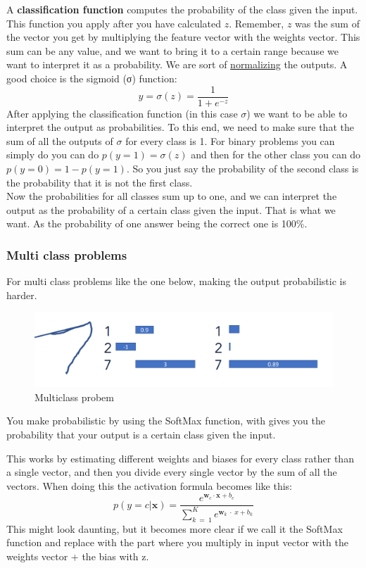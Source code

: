 \documentclass[
  11pt,
  british,
]{article}
\begin{document}
A \textbf{classification function} computes the probability of the class
given the input. This function you apply after you have calculated
\(z\). Remember, \(z\) was the sum of the vector you get by multiplying
the feature vector with the weights vector. This sum can be any value,
and we want to bring it to a certain range because we want to interpret
it as a probability. We are sort of
\href{../Data/Normalization.md}{normalizing} the outputs. A good choice
is the sigmoid (σ) function: \[y = \sigma(z)=\frac{1}{1+e^{-z}}\] After
applying the classification function (in this case \(\sigma\)) we want
to be able to interpret the output as probabilities. To this end, we
need to make sure that the sum of all the outputs of \(\sigma\) for
every class is 1. For binary problems you can simply do you can do
\(p(y=1) = \sigma(z)\) and then for the other class you can do
\(p(y=0) = 1 - p(y=1)\). So you just say the probability of the second
class is the probability that it is not the first class.\\
Now the probabilities for all classes sum up to one, and we can
interpret the output as the probability of a certain class given the
input. That is what we want. As the probability of one answer being the
correct one is 100\%.

\hypertarget{multi-class-problems}{%
\subsubsection{Multi class problems}\label{multi-class-problems}}

For multi class problems like the one below, making the output
probabilistic is harder.

\begin{figure}
\centering
\includegraphics{Pasted_image_20220603192841.png}
\caption{Multiclass probem}
\end{figure}

You make probabilistic by using the SoftMax function, with gives you the
probability that your output is a certain class given the input.

This works by estimating different weights and biases for every class
rather than a single vector, and then you divide every single vector by
the sum of all the vectors. When doing this the activation formula
becomes like this:
\[p(y=c|\mathbf{x}) = \frac{e^{\mathbf{w}_{c} \cdot \mathbf{x} + b_c}}{\sum\limits^{K}_{k~=~1}e^{\mathbf{w}_{k}~\cdot~x+b_{k}}}\]
This might look daunting, but it becomes more clear if we call it the
SoftMax function and replace with the part where you multiply in input
vector with the weights vector + the bias with z.
\end{document}
